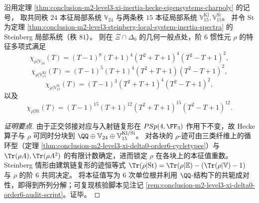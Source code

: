 \begin{theorem}\label{thm:conclusion-m2-level3-xi-delta0-order6-charpolys}
沿用定理 \ref{thm:conclusion-m2-level3-xi-inertia-hecke-eigensystems-charpoly} 的记号，
取共同秩 \(24\) 本征局部系统 \(\mathbb V_{24}\) 与两条秩 \(15\) 本征局部系统 \(\mathbb V_{15}^{\mathrm{Kl}},\mathbb V_{15}^{\mathrm{Si}}\)。
并令 \(\mathrm{St}\) 为定理 \ref{thm:conclusion-m2-level3-steinberg-local-system-inertia-spectra} 的 Steinberg 局部系统（秩 \(81\)）。
则在 \(\overline{\Xi}\cap\Delta_0\) 的几何一般点处，阶 \(6\) 惯性元 \(\rho\) 的特征多项式满足
\[
\chi_{\rho|\mathbb V_{24}}(T)=(T-1)^8(T+1)^4(T^2+T+1)^4(T^2-T+1)^2,
\]
\[
\chi_{\rho|\mathbb V_{15}^{\mathrm{Kl}}}(T)=(T-1)^5(T+1)^4(T^2+T+1)(T^2-T+1)^2,
\]
\[
\chi_{\rho|\mathbb V_{15}^{\mathrm{Si}}}(T)=(T-1)^3(T^2+T+1)^4(T^2-T+1)^2,
\]
以及
\[
\chi_{\rho|\mathrm{St}}(T)=(T-1)^{15}(T+1)^{12}(T^2+T+1)^{15}(T^2-T+1)^{12}.
\]
\end{theorem}
\begin{proof}[证明要点]
由于正交邻接对应与入射链复形在 \(PSp(4,\FF_3)\) 作用下不变，故 Hecke 算子与 \(\rho\) 可同时分块到
\(
\QQ\oplus \mathbb V_{24}\oplus \mathbb V_{15}^{\mathrm{Kl}/\mathrm{Si}}
\)。
对各块的 \(\rho\)-迹可由三类纤维上的循环型（定理 \ref{thm:conclusion-m2-level3-xi-delta0-order6-cycletypes}）与
\(\Tr(\rho A),\Tr(\rho A^2)\) 的有限计数确定，进而锁定 \(\rho\) 在各块上的本征值重数。
Steinberg 情形由建筑链复形的迹恒等式
\(
\Tr(\rho|\mathrm{St})=\Tr(\rho|\mathbb E)-(\Tr(\rho|\mathbb V)-1)
\)
与 \(\rho\) 的阶 \(6\) 共同决定。
将本征值写为 \(6\) 次单位根并利用 \(\QQ\)-结构下的共轭成对性，即得到所列分解；可复现核验脚本见注记 \ref{rem:conclusion-m2-level3-xi-delta0-order6-audit-script}。证毕。
\end{proof}

